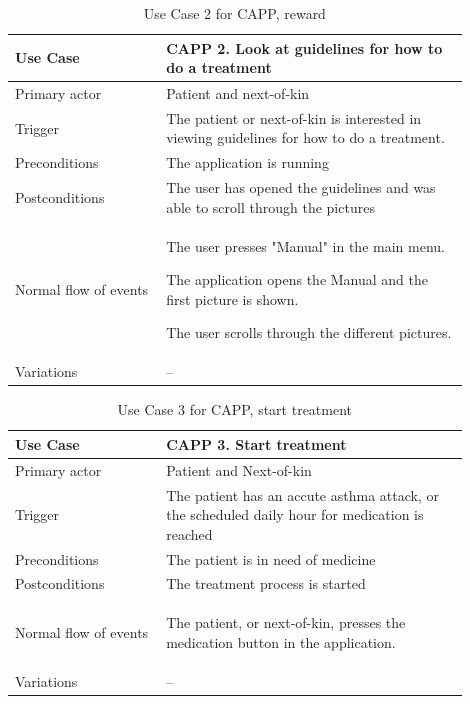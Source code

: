 \begin{table}
	\begin{center}
	    \begin{tabular}{|p{0.3\linewidth}|p{0.6\linewidth}|}
		    \hline
		    Use Case & CAPP 2. Look at guidelines for how to do a treatment\\ \hline
		    Primary actor & Patient and next-of-kin \\ \hline
		    Trigger & The patient or next-of-kin is interested in viewing guidelines for how to do a treatment. \\ \hline
		    Preconditions & The application is running \\ \hline
		    Postconditions & The user has opened the guidelines and was able to scroll through the pictures\\ \hline
		    Normal flow of events &
		    	\begin{tabulenum}
		    	  \item The user presses "Manual" in the main menu.
		    	  \item The application opens the Manual and the first picture is shown.
		    	  \item The user scrolls through the different pictures.
		    	\end{tabulenum} \\ \hline
		    Variations & -- \\ \hline
	    \end{tabular}
    \end{center}
    \caption{Use Case 2 for CAPP, reward}
    \label{tab:cappUseCase2}
\end{table}

\begin{table}
	\begin{center}
	    \begin{tabular}{|p{0.3\linewidth}|p{0.6\linewidth}|}
		    \hline
		    Use Case &  CAPP 3. Start treatment \\ \hline
		    Primary actor & Patient and Next-of-kin \\ \hline
		    Trigger & The patient has an accute asthma attack, or the scheduled daily hour for medication is reached \\ \hline
		    Preconditions & The patient is in need of medicine \\ \hline
		    Postconditions & The treatment process is started \\ \hline
		    Normal flow of events &
				\begin{tabulenum}
				  \item The patient, or next-of-kin, presses the medication button in the application.
				\end{tabulenum} \\ \hline
		    Variations & -- \\ \hline
	    \end{tabular}
    \end{center}
    \caption{Use Case 3 for CAPP, start treatment}
    \label{tab:cappUseCase3}
\end{table}

